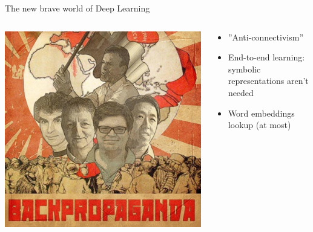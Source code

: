 \begin{frame}{The new brave world of Deep Learning}
	\vspace{-15pt}
	
	
\begin{columns}
\begin{column}{0.6\textwidth}
   
 \begin{center}
  	\includegraphics[width=1.0\textwidth]{figures/backprop}
  \end{center}
  
\end{column}
\begin{column}{0.4\textwidth} 
  
 \begin{itemize}
 \item ''Anti-connectivism'' 
 \item End-to-end learning: \alert{symbolic representations aren't needed}
 \pause 
 
 \item Word embeddings lookup (at most)
 	
 \end{itemize}

  
\end{column}
\end{columns}

\end{frame}




